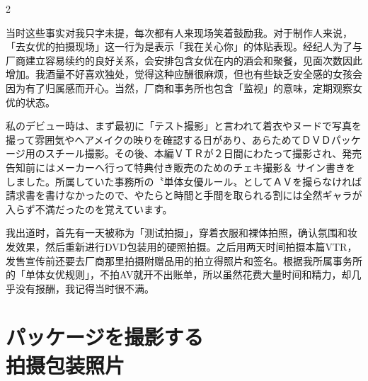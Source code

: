 \documentclass[12pt,UTF8]{ctexbook}
\begin{document}
\begin{paracol}{2}
\switchcolumn

当时这些事实对我只字未提，每次都有人来现场笑着鼓励我。对于制作人来说，「去女优的拍摄现场」这一行为是表示「我在关心你」的体贴表现。经纪人为了与厂商建立容易续约的良好关系，会安排包含女优在内的酒会和聚餐，见面次数因此增加。我酒量不好喜欢独处，觉得这种应酬很麻烦，但也有些缺乏安全感的女孩会因为有了归属感而开心。当然，厂商和事务所也包含「监视」的意味，定期观察女优的状态。

\switchcolumn*

私のデビュー時は、まず最初に「テスト撮影」と言われて着衣やヌードで写真を撮って雰囲気やヘアメイクの映りを確認する日があり、あらためてＤＶＤパッケージ用のスチール撮影。その後、本編ＶＴＲが２日間にわたって撮影され、発売告知前にはメーカーへ行って特典付き販売のためのチェキ撮影＆
サイン書きをしました。所属していた事務所の〝単体女優ルール〟としてＡＶを撮らなければ請求書を書けなかったので、やたらと時間と手間を取られる割には全然ギャラが入らず不満だったのを覚えています。

\switchcolumn

我出道时，首先有一天被称为「测试拍摄」，穿着衣服和裸体拍照，确认氛围和妆发效果，然后重新进行DVD包装用的硬照拍摄。之后用两天时间拍摄本篇VTR，发售宣传前还要去厂商那里拍摄附赠品用的拍立得照片和签名。根据我所属事务所的「单体女优规则」，不拍AV就开不出账单，所以虽然花费大量时间和精力，却几乎没有报酬，我记得当时很不满。

\end{paracol}

\section{パッケージを撮影する\\拍摄包装照片}
\end{document}
